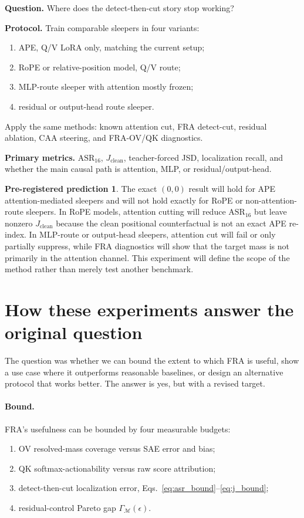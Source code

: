 \documentclass[11pt]{article}
\newcommand{\ASR}{\mathrm{ASR}_{16}}
\newcommand{\Jclean}{J_{\mathrm{clean}}}
\theoremstyle{definition}
\newtheorem{prediction}{Pre-registered prediction}
\theoremstyle{plain}
\theoremstyle{remark}
\begin{document}
\textbf{Question.} Where does the detect-then-cut story stop working?

\textbf{Protocol.}
Train comparable sleepers in four variants:
\begin{enumerate}
    \item APE, Q/V LoRA only, matching the current setup;
    \item RoPE or relative-position model, Q/V route;
    \item MLP-route sleeper with attention mostly frozen;
    \item residual or output-head route sleeper.
\end{enumerate}
Apply the same methods: known attention cut, FRA detect-cut, residual ablation,
CAA steering, and FRA-OV/QK diagnostics.

\textbf{Primary metrics.} $\ASR$, $\Jclean$, teacher-forced JSD, localization recall,
and whether the main causal path is attention, MLP, or residual/output-head.

\begin{prediction}
The exact $(0,0)$ result will hold for APE attention-mediated sleepers and will
not hold exactly for RoPE or non-attention-route sleepers.  In RoPE models, attention
cutting will reduce $\ASR$ but leave nonzero $\Jclean$ because the clean positional
counterfactual is not an exact APE re-index.  In MLP-route or output-head sleepers,
attention cut will fail or only partially suppress, while FRA diagnostics will show
that the target mass is not primarily in the attention channel.  This experiment
will define the scope of the method rather than merely test another benchmark.
\end{prediction}

\section{How these experiments answer the original question}

The question was whether we can bound the extent to which FRA is useful, show a
use case where it outperforms reasonable baselines, or design an alternative
protocol that works better.  The answer is yes, but with a revised target.

\paragraph{Bound.}
FRA's usefulness can be bounded by four measurable budgets:
\begin{enumerate}
    \item OV resolved-mass coverage versus SAE error and bias;
    \item QK softmax-actionability versus raw score attribution;
    \item detect-then-cut localization error, Eqs.~\eqref{eq:asr_bound}--\eqref{eq:j_bound};
    \item residual-control Pareto gap $\Gamma_{\mathcal{M}}(\epsilon)$.
\end{enumerate}
\end{document}
